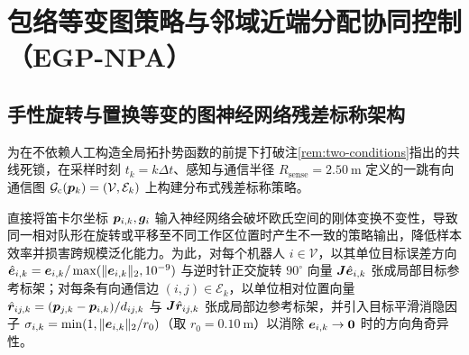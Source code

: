 \section{包络等变图策略与邻域近端分配协同控制（EGP-NPA）}\label{sec:method}

\subsection{手性旋转与置换等变的图神经网络残差标称架构}\label{subsec:gnn-arch}
为在不依赖人工构造全局拓扑势函数的前提下打破注\ref{rem:two-conditions}指出的共线死锁，在采样时刻 $t_k=k\Delta t$、感知与通信半径 $R_{\mathrm{sense}}=2.50\ \mathrm m$ 定义的一跳有向通信图 $\mathcal G_{\mathrm c}(\boldsymbol{p}_k)=(\mathcal V,\mathcal E_k)$ 上构建分布式残差标称策略。

直接将笛卡尔坐标 $\boldsymbol{p}_{i,k},\boldsymbol{g}_i$ 输入神经网络会破坏欧氏空间的刚体变换不变性，导致同一相对队形在旋转或平移至不同工作区位置时产生不一致的策略输出，降低样本效率并损害跨规模泛化能力\cite{satorras2021egnn}。为此，对每个机器人 $i\in\mathcal V$，以其单位目标误差方向 $\hat{\boldsymbol{e}}_{i,k}=\boldsymbol{e}_{i,k}/\max(\lVert\boldsymbol{e}_{i,k}\rVert_2,10^{-9})$ 与逆时针正交旋转 $90^\circ$ 向量 $\boldsymbol{J}\hat{\boldsymbol{e}}_{i,k}$ 张成局部目标参考标架；对每条有向通信边 $(i,j)\in\mathcal E_k$，以单位相对位置向量 $\hat{\boldsymbol{r}}_{ij,k}=(\boldsymbol{p}_{j,k}-\boldsymbol{p}_{i,k})/d_{ij,k}$ 与 $\boldsymbol{J}\hat{\boldsymbol{r}}_{ij,k}$ 张成局部边参考标架，并引入目标平滑消隐因子 $\sigma_{i,k}=\min(1,\lVert\boldsymbol{e}_{i,k}\rVert_2/r_0)$（取 $r_0=0.10\ \mathrm m$）以消除 $\boldsymbol{e}_{i,k}\to\boldsymbol 0$ 时的方向角奇异性。


